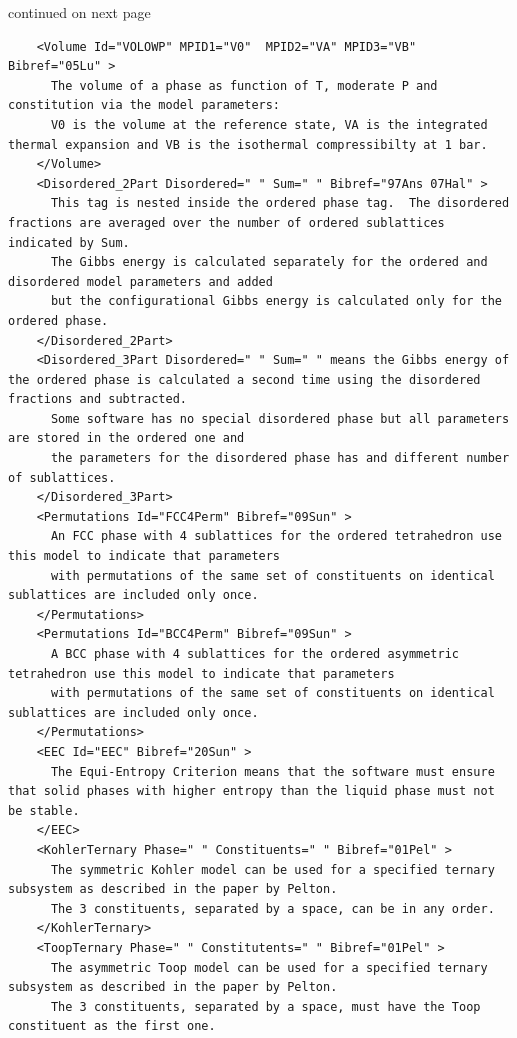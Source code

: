 \documentclass{article}
\begin{document}
\begin{appendices}
\bigskip
continued on next page

\newpage
{\small
\begin{verbatim}
    <Volume Id="VOLOWP" MPID1="V0"  MPID2="VA" MPID3="VB" Bibref="05Lu" > 
      The volume of a phase as function of T, moderate P and constitution via the model parameters:
      V0 is the volume at the reference state, VA is the integrated thermal expansion and VB is the isothermal compressibilty at 1 bar.
    </Volume>
    <Disordered_2Part Disordered=" " Sum=" " Bibref="97Ans 07Hal" > 
      This tag is nested inside the ordered phase tag.  The disordered fractions are averaged over the number of ordered sublattices indicated by Sum.
      The Gibbs energy is calculated separately for the ordered and disordered model parameters and added 
      but the configurational Gibbs energy is calculated only for the ordered phase.
    </Disordered_2Part>
    <Disordered_3Part Disordered=" " Sum=" " means the Gibbs energy of the ordered phase is calculated a second time using the disordered fractions and subtracted.
      Some software has no special disordered phase but all parameters are stored in the ordered one and
      the parameters for the disordered phase has and different number of sublattices.
    </Disordered_3Part>
    <Permutations Id="FCC4Perm" Bibref="09Sun" > 
      An FCC phase with 4 sublattices for the ordered tetrahedron use this model to indicate that parameters 
      with permutations of the same set of constituents on identical sublattices are included only once.
    </Permutations>
    <Permutations Id="BCC4Perm" Bibref="09Sun" > 
      A BCC phase with 4 sublattices for the ordered asymmetric tetrahedron use this model to indicate that parameters 
      with permutations of the same set of constituents on identical sublattices are included only once.
    </Permutations>
    <EEC Id="EEC" Bibref="20Sun" > 
      The Equi-Entropy Criterion means that the software must ensure that solid phases with higher entropy than the liquid phase must not be stable. 
    </EEC>
    <KohlerTernary Phase=" " Constituents=" " Bibref="01Pel" > 
      The symmetric Kohler model can be used for a specified ternary subsystem as described in the paper by Pelton.
      The 3 constituents, separated by a space, can be in any order.
    </KohlerTernary>
    <ToopTernary Phase=" " Constitutents=" " Bibref="01Pel" > 
      The asymmetric Toop model can be used for a specified ternary subsystem as described in the paper by Pelton.
      The 3 constituents, separated by a space, must have the Toop constituent as the first one.

\end{verbatim}}
\end{appendices}
\end{document}
